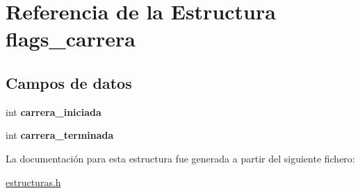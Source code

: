 \hypertarget{structflags__carrera}{}\section{Referencia de la Estructura flags\+\_\+carrera}
\label{structflags__carrera}
\subsection*{Campos de datos}
\begin{DoxyCompactItemize}
\item 
\mbox{\label{structflags__carrera_afa6c9fd3f180360a0dc028074ec6d982}} 
int {\bfseries carrera\+\_\+iniciada}
\item 
\mbox{\label{structflags__carrera_afe276d809ddc1b6279e980888c61980a}} 
int {\bfseries carrera\+\_\+terminada}
\end{DoxyCompactItemize}


La documentación para esta estructura fue generada a partir del siguiente fichero\+:\begin{DoxyCompactItemize}
\item 
\hyperlink{estructuras_8h}{estructuras.\+h}\end{DoxyCompactItemize}
